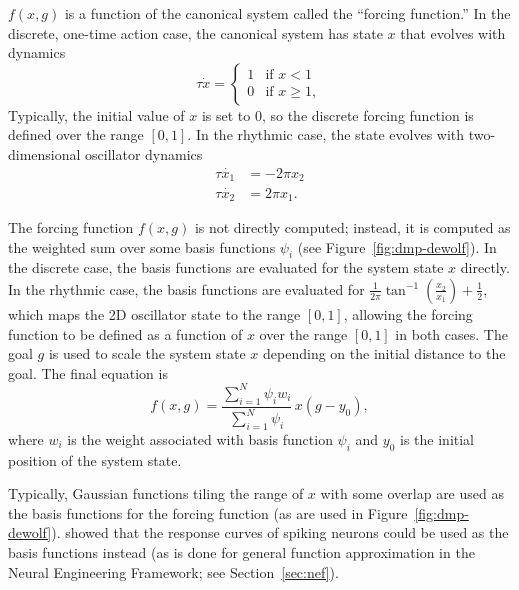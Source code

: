 $f(x, g)$ is a function
of the canonical system
called the ``forcing function.''
In the discrete, one-time action case,
the canonical system
has state $x$ that evolves
with dynamics
\begin{equation} \label{dmp-discrete}
  \tau\dot{x} =
  \begin{cases}
    1 &\text{if } x < 1 \\
    0 &\text{if } x \ge 1,
  \end{cases}
\end{equation}
Typically, the initial value of $x$
is set to 0,
so the discrete forcing function
is defined over the range $[0, 1]$.
In the rhythmic case,
the state evolves with
two-dimensional oscillator dynamics
\begin{align}
  \tau \dot{x_1} &= -2 \pi x_2 \nonumber \\
  \tau \dot{x_2} &= 2 \pi x_1.
  \label{dmp-rhythmic}
\end{align}


The forcing function $f(x, g)$ is
not directly computed;
instead, it is computed as the weighted sum
over some basis functions $\psi_i$
(see Figure~\ref{fig:dmp-dewolf}).
In the discrete case,
the basis functions are evaluated
for the system state $x$ directly.
In the rhythmic case,
the basis functions are evaluated for
$\textstyle \frac{1}{2\pi}\tan^{-1}\left(\frac{x_2}{x_1}\right)+ \frac{1}{2}$,
which maps the 2D oscillator state
to the range $[0, 1]$,
allowing the forcing function to be defined
as a function of $x$ over the range $[0, 1]$
in both cases.
The goal $g$ is used
to scale the system state $x$ depending on
the initial distance to the goal.
The final equation is
\begin{equation} \label{dmp-forcing-func}
  f(x, g) = \frac{\sum_{i=1}^N \psi_i w_i}{\sum_{i=1}^N \psi_i} \, x(g - y_0),
\end{equation}
where $w_i$ is the weight associated with
basis function $\psi_i$ and $y_0$
is the initial position of
the system state.

Typically, Gaussian functions
tiling the range of $x$ with some overlap
are used as the basis functions
for the forcing function
(as are used in Figure~\ref{fig:dmp-dewolf}).
\citet{dewolf2015} showed that
the response curves of spiking neurons
could be used as the
basis functions instead
(as is done for general function approximation
in the Neural Engineering Framework;
see Section~\ref{sec:nef}).

